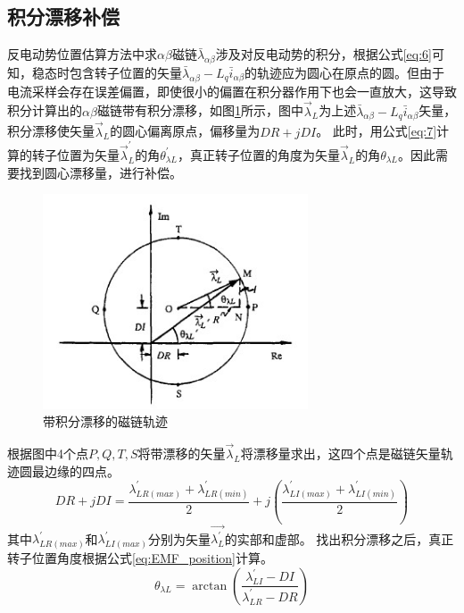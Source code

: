 \subsection{积分漂移补偿}
反电动势位置估算方法中求$\alpha\beta$磁链$\bar{\lambda}_{\alpha\beta}$涉及对反电动势的积分，根据公式\ref{eq:6}可知，稳态时包含转子位置的矢量$\bar{\lambda}_{\alpha\beta}-L_{q}\bar{i}_{\alpha\beta}$的轨迹应为圆心在原点的圆。但由于电流采样会存在误差偏置，即使很小的偏置在积分器作用下也会一直放大，这导致积分计算出的$\alpha\beta$磁链带有积分漂移，如图\ref{fig:dc_removal}所示，图中$\overrightarrow{\lambda}_{L}$为上述$\bar{\lambda}_{\alpha\beta}-L_{q}\bar{i}_{\alpha\beta}$矢量，积分漂移使矢量$\overrightarrow{\lambda}_{L}$的圆心偏离原点，偏移量为$DR+jDI$。
此时，用公式\ref{eq:7}计算的转子位置为矢量$\overrightarrow{\lambda}_{L}^{\prime}$的角$\theta_{\lambda L}^{\prime}$，真正转子位置的角度为矢量$\overrightarrow{\lambda}_{L}$的角$\theta_{\lambda L}$。因此需要找到圆心漂移量，进行补偿\cite{drift}。
\begin{figure}[H]
	\centering
	\includegraphics[width=0.7\textwidth]{figs/dc_removal.jpg}
	\caption{带积分漂移的磁链轨迹}
	\label{fig:dc_removal}
\end{figure}
根据图中4个点$P,Q,T,S$将带漂移的矢量$\overrightarrow{\lambda}_{L}$将漂移量求出，这四个点是磁链矢量轨迹圆最边缘的四点。
\begin{equation}
DR+jDI=\frac{\lambda_{LR(max)}^{\prime}+\lambda_{LR(min)}^{\prime}}{2}+j\left(\frac{\lambda_{LI(max)}^{\prime}+\lambda_{LI(min)}^{\prime}}{2} \right)
\end{equation}
其中$\lambda_{LR(max)}^{\prime}$和$\lambda_{LI(max)}^{\prime}$分别为矢量$\overrightarrow{\lambda_{L}^{\prime}}$的实部和虚部。
找出积分漂移之后，真正转子位置角度根据公式\ref{eq:EMF_position}计算。
\begin{equation}\label{eq:EMF_position}
\theta_{\lambda L}=\arctan{\left(\frac{\lambda_{LI}^{\prime}-DI}{\lambda_{LR}^{\prime}-DR}\right)}
\end{equation}
